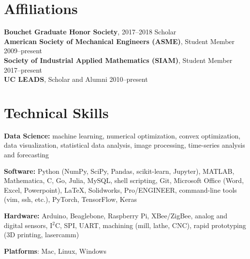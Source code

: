 \documentclass[10pt]{res}
\begin{document}
\begin{resume}
\section{Affiliations}
\vspace{0.1in}

\textbf{Bouchet Graduate Honor Society}, 2017--2018 Scholar \\
\textbf{American Society of Mechanical Engineers (ASME)}, Student Member \hfill 2009--present \\
\textbf{Society of Industrial Applied Mathematics (SIAM)}, Student Member \hfill 2017--present \\
\textbf{UC LEADS}, Scholar and Alumni \hfill 2010--present


\section{Technical Skills}
\vspace{0.1in}

\textbf{Data Science:} machine learning, numerical optimization, convex
optimization, data visualization, statistical data analysis, image processing,
time-series analysis and forecasting

\textbf{Software:} Python (NumPy, SciPy, Pandas, scikit-learn, Jupyter),
MATLAB, Mathematica, C, Go, Julia, MySQL, shell scripting, Git, Microsoft Office
(Word, Excel, Powerpoint), LaTeX, Solidworks, Pro/ENGINEER, command-line tools
(vim, ssh, etc.), PyTorch, TensorFlow, Keras

\textbf{Hardware:} Arduino, Beaglebone, Raspberry Pi, XBee/ZigBee, analog and
digital sensors, I$^2$C, SPI, UART, machining (mill, lathe, CNC), rapid
prototyping (3D printing, lasercamm)

\textbf{Platforms}: Mac, Linux, Windows

\end{resume}
\end{document}
